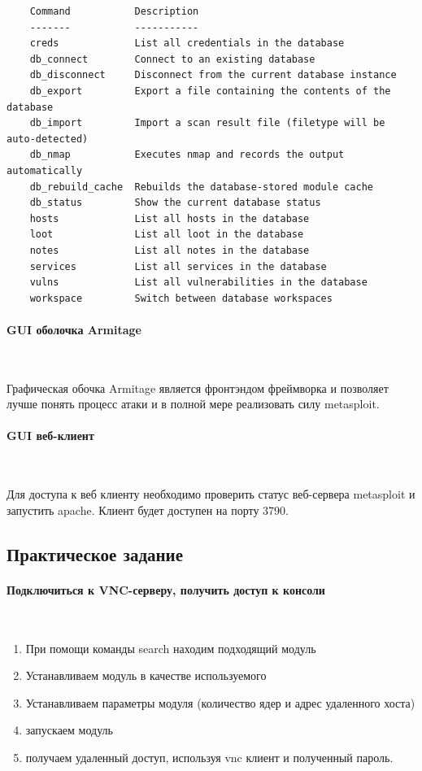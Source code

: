 \documentclass{article}
\begin{document}
\begin{verbatim}
    Command           Description
    -------           -----------
    creds             List all credentials in the database
    db_connect        Connect to an existing database
    db_disconnect     Disconnect from the current database instance
    db_export         Export a file containing the contents of the database
    db_import         Import a scan result file (filetype will be auto-detected)
    db_nmap           Executes nmap and records the output automatically
    db_rebuild_cache  Rebuilds the database-stored module cache
    db_status         Show the current database status
    hosts             List all hosts in the database
    loot              List all loot in the database
    notes             List all notes in the database
    services          List all services in the database
    vulns             List all vulnerabilities in the database
    workspace         Switch between database workspaces

\end{verbatim}

\paragraph{GUI оболочка Armitage}
~

Графическая обочка Armitage является фронтэндом фреймворка и позволяет лучше понять процесс атаки и в полной мере реализовать силу metasploit.

\paragraph{GUI веб-клиент}
~

Для доступа к веб клиенту необходимо проверить статус веб-сервера metasploit и запустить apache. Клиент будет доступен на порту 3790.

\subsection{Практическое задание}

\paragraph{Подключиться к VNC-серверу, получить доступ к консоли}
~

\begin{enumerate}
\item При помощи команды search находим подходящий модуль
\item Устанавливаем модуль в качестве используемого
\item Устанавливаем параметры модуля (количество ядер и адрес удаленного хоста)
\item запускаем модуль
\item получаем удаленный доступ, используя vnc клиент и полученный пароль.
\end{enumerate}
\end{document}
